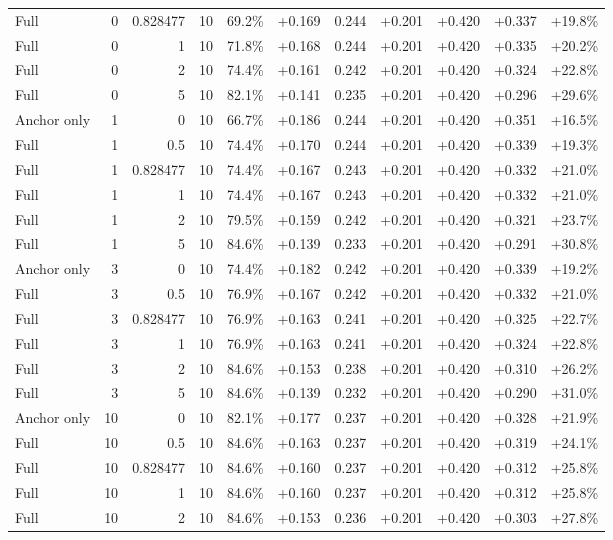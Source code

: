 \begin{table}[htbp]
\begin{tabular}{lrrrccccccc}
Full & 0 & 0.828477 & 10 & 69.2\% & +0.169 & 0.244 & +0.201 & +0.420 & +0.337 & +19.8\% \\
Full & 0 & 1 & 10 & 71.8\% & +0.168 & 0.244 & +0.201 & +0.420 & +0.335 & +20.2\% \\
Full & 0 & 2 & 10 & 74.4\% & +0.161 & 0.242 & +0.201 & +0.420 & +0.324 & +22.8\% \\
Full & 0 & 5 & 10 & 82.1\% & +0.141 & 0.235 & +0.201 & +0.420 & +0.296 & +29.6\% \\
Anchor only & 1 & 0 & 10 & 66.7\% & +0.186 & 0.244 & +0.201 & +0.420 & +0.351 & +16.5\% \\
Full & 1 & 0.5 & 10 & 74.4\% & +0.170 & 0.244 & +0.201 & +0.420 & +0.339 & +19.3\% \\
Full & 1 & 0.828477 & 10 & 74.4\% & +0.167 & 0.243 & +0.201 & +0.420 & +0.332 & +21.0\% \\
Full & 1 & 1 & 10 & 74.4\% & +0.167 & 0.243 & +0.201 & +0.420 & +0.332 & +21.0\% \\
Full & 1 & 2 & 10 & 79.5\% & +0.159 & 0.242 & +0.201 & +0.420 & +0.321 & +23.7\% \\
Full & 1 & 5 & 10 & 84.6\% & +0.139 & 0.233 & +0.201 & +0.420 & +0.291 & +30.8\% \\
Anchor only & 3 & 0 & 10 & 74.4\% & +0.182 & 0.242 & +0.201 & +0.420 & +0.339 & +19.2\% \\
Full & 3 & 0.5 & 10 & 76.9\% & +0.167 & 0.242 & +0.201 & +0.420 & +0.332 & +21.0\% \\
Full & 3 & 0.828477 & 10 & 76.9\% & +0.163 & 0.241 & +0.201 & +0.420 & +0.325 & +22.7\% \\
Full & 3 & 1 & 10 & 76.9\% & +0.163 & 0.241 & +0.201 & +0.420 & +0.324 & +22.8\% \\
Full & 3 & 2 & 10 & 84.6\% & +0.153 & 0.238 & +0.201 & +0.420 & +0.310 & +26.2\% \\
Full & 3 & 5 & 10 & 84.6\% & +0.139 & 0.232 & +0.201 & +0.420 & +0.290 & +31.0\% \\
Anchor only & 10 & 0 & 10 & 82.1\% & +0.177 & 0.237 & +0.201 & +0.420 & +0.328 & +21.9\% \\
Full & 10 & 0.5 & 10 & 84.6\% & +0.163 & 0.237 & +0.201 & +0.420 & +0.319 & +24.1\% \\
Full & 10 & 0.828477 & 10 & 84.6\% & +0.160 & 0.237 & +0.201 & +0.420 & +0.312 & +25.8\% \\
Full & 10 & 1 & 10 & 84.6\% & +0.160 & 0.237 & +0.201 & +0.420 & +0.312 & +25.8\% \\
Full & 10 & 2 & 10 & 84.6\% & +0.153 & 0.236 & +0.201 & +0.420 & +0.303 & +27.8\% \\

\end{tabular}
\end{table}
